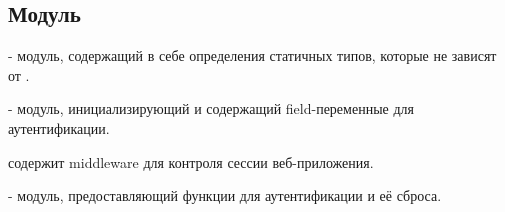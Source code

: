 \subsection{Модуль }\label{page-FPauth-core-module-FPauth+u+core}%
\label{page-FPauth-core-module-FPauth+u+core-module-Static}\begin{ocamlindent} - модуль, содержащий в себе определения статичных типов, которые не зависят от \hyperref[page-FPauth-core-module-FPauth+u+core-module-Auth+u+sign-module-type-MODEL]{}.\end{ocamlindent}%
\medbreak
\label{page-FPauth-core-module-FPauth+u+core-module-Variables}\begin{ocamlindent} - модуль, инициализирующий и содержащий field-переменные для аутентификации.\end{ocamlindent}%
\medbreak
\label{page-FPauth-core-module-FPauth+u+core-module-Session+u+manager}\begin{ocamlindent} содержит middleware для контроля сессии веб-приложения.\end{ocamlindent}%
\medbreak
\label{page-FPauth-core-module-FPauth+u+core-module-Authenticator}\begin{ocamlindent} - модуль, предоставляющий функции для аутентификации и её сброса.\end{ocamlindent}%
